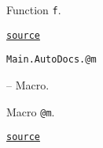 \begin{adjustwidth}{2em}{0pt}

Function \texttt{f}.



\href{https://example.org/Repository.jl/blob/test/examples/make.jl#L85-85}{\texttt{source}}


\end{adjustwidth}
\hypertarget{7256264955516068825}{\texttt{Main.AutoDocs.@m}}  -- {Macro.}

\begin{adjustwidth}{2em}{0pt}

Macro \texttt{@m}.



\href{https://example.org/Repository.jl/blob/test/examples/make.jl#L94-94}{\texttt{source}}


\end{adjustwidth}



